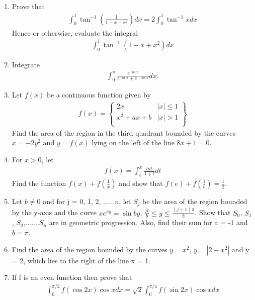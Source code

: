 \begin{enumerate}[label=\arabic*.,ref=\thesubsection.\theenumi]
\item Prove that
\begin{align*}
\int_{0}^{1}\tan^{-1}\left(\frac{1}{1 - x + x^2}\right) dx = 2\int_{0}^{1}\tan^{-1}xdx
\end{align*}
Hence or otherwise, evaluate the integral
\begin{align*}
\int_{0}^{1}\tan^{-1}\left(1 - x + x^{2}\right) dx
\end{align*}

\item Integrate
\begin{align*}
\int_{0}^{\pi}\frac{e^{\cos x}}{e^{\cos x} + e^{-\cos x}}dx.
\end{align*}

\item Let $f(x)$ be a continuous function given by
\begin{align*}
f(x) = 
\left\lbrace
\begin{array}{ll}
      2x & |x| \leq 1 \\
      x^2 + ax + b & |x| > 1 \\
\end{array} 
\right\rbrace
\end{align*}
Find the area of the region in the third quadrant bounded by the curves $x = -2y^{2}$ and $y = f(x)$ lying on the left of the line $8x + 1 = 0$.

\item For $x > 0$, let 
\begin{align*}
f(x) = \int_{e}^{x}\frac{ln t}{1 + t}dt
\end{align*}
Find the function $f(x) + f(\frac{1}{x})$ and show that $f(e) + f(\frac{1}{e}) = \frac{1}{2}$.

\item Let $b \neq 0$ and for j = 0, 1, 2, ......n, let $S_j$ be the area of the region bounded by the y-axis and the curve $xe^{ay} = \sin by$, $\frac{jr}{b} \leq y \leq \frac{(j + 1)\pi}{b}$. Show that $S_0$, $S_1$, $S_2$,.......$S_n$ are in geometric progression. Also, find their sum for a = -1 and $b = \pi$.

\item Find the area of the region bounded by the curves $y = x^2$, $y = |2 - x^2|$ and y = 2, which lies to the right of the line x = 1.

\item If f is an even function then prove that
\begin{align*}
\int_{0}^{\pi/2}f(\cos 2x)\cos x dx = \sqrt{2}\int_{0}^{\pi/4}f(\sin 2x)\cos x dx
\end{align*}


\end{enumerate}
